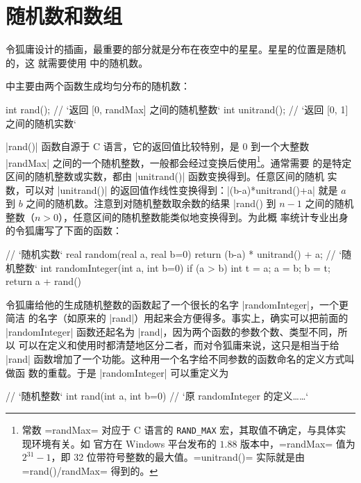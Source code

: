 \section{随机数和数组}
\label{sec:randomarray}

令狐庸设计的插画，最重要的部分就是分布在夜空中的星星。星星的位置是随机的，这
就需要使用 \Asy{} 中的随机数。

\Asy{} 中主要由两个函数生成均匀分布的随机数：
\begin{asycode}
int rand();         // `\color{comment}返回 [0, randMax] 之间的随机整数`
int unitrand();     // `\color{comment}返回 [0, 1] 之间的随机实数`
\end{asycode}
|rand()| 函数自源于 C 语言，它的返回值比较特别，是 $0$ 到一个大整数 |randMax|
之间的一个随机整数，一般都会经过变换后使用\footnote{常数 \asyinline=randMax= 
对应于 C 语言的 \lstinline=RAND_MAX= 宏，其取值不确定，与具体实现环境有关。如
官方在 Windows 平台发布的 $1.88$ 版本中，\asyinline=randMax= 值为
$2^{31}-1$，即 32 位带符号整数的最大值。\asyinline=unitrand()= 实际就是由
\asyinline=rand()/randMax= 得到的。}。通常需要
的是特定区间的随机整数或实数，都由 |unitrand()| 函数变换得到。任意区间的随机
实数，可以对 |unitrand()| 的返回值作线性变换得到：|(b-a)*unitrand()+a| 就是
$a$ 到 $b$ 之间的随机数。注意到对随机整数取余数的结果 |rand() %
到 $n-1$ 之间的随机整数（$n>0$），任意区间的随机整数能类似地变换得到。为此概
率统计专业出身的令狐庸写了下面的函数：
\begin{asycode}
// `\color{comment}随机实数`
real random(real a, real b=0)
{
    return (b-a) * unitrand() + a;
}
// `\color{comment}随机整数`
int randomInteger(int a, int b=0)
{
    if (a > b) {
        int t = a;
        a = b;
        b = t;
    }
    return a + rand() %
}
\end{asycode}

令狐庸给他的生成随机整数的函数起了一个很长的名字 |randomInteger|，一个更简洁
的名字（如原来的 |rand|）用起来会方便得多。事实上，确实可以把前面的
|randomInteger| 函数还起名为 |rand|，因为两个函数的参数个数、类型不同，所以
\Asy{} 可以在定义和使用时都清楚地区分二者，而对令狐庸来说，这只是相当于给
|rand| 函数增加了一个功能。这种用一个名字给不同参数的函数命名的定义方式叫做函
数的重载。于是 |randomInteger| 可以重定义为
\begin{asycode}
// `\color{comment}随机整数`
int rand(int a, int b=0)
{
    // `\color{comment}原 randomInteger 的定义……`
}
\end{asycode}

